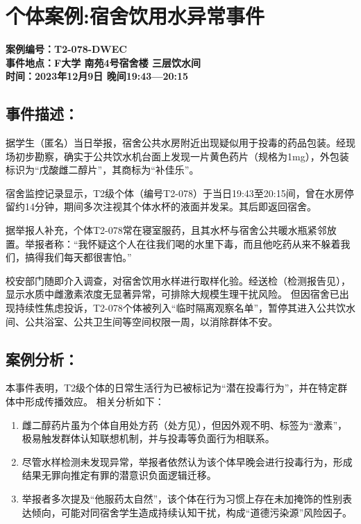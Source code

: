 \documentclass[]{ctexrep}
\begin{document}
	\section{个体案例:宿舍饮用水异常事件}
	\begin{center}
		\textbf{案例编号：T2-078-DWEC\\
	事件地点：F大学 南苑4号宿舍楼 三层饮水间\\
	时间：2023年12月9日 晚间19:43—20:15}
	\end{center}
	\subsection{事件描述：}
	据学生（匿名）当日举报，宿舍公共水房附近出现疑似用于投毒的药品包装。经现场初步勘察，确实于公共饮水机台面上发现一片黄色药片（规格为1mg），外包装标识为“戊酸雌二醇片”，其商标为“补佳乐”。
	
	宿舍监控记录显示，T2级个体（编号T2-078）于当日19:43至20:15间，曾在水房停留约14分钟，期间多次注视其个体水杯的液面并发呆。其后即返回宿舍。
	
	据举报人补充，个体T2-078常在寝室服药，且其水杯与宿舍公共暖水瓶紧邻放置。举报者称：“我怀疑这个人在往我们喝的水里下毒，而且他吃药从来不躲着我们，搞得我们每天都很害怕。”
	
	校安部门随即介入调查，对宿舍饮用水样进行取样化验。经送检（检测报告见\hyperref[附件3.1]{}），显示水质中雌激素浓度无显著异常，可排除大规模生理干扰风险。
	但因宿舍已出现持续性焦虑投诉，T2-078个体被列入“临时隔离观察名单”，暂停其进入公共饮水间、公共浴室、公共卫生间等空间权限一周，以消除群体不安。
	
	\subsection{案例分析：}
	本事件表明，T2级个体的日常生活行为已被标记为“潜在投毒行为”，并在特定群体中形成传播效应。
	相关分析如下：
	\begin{enumerate}
		\item 雌二醇药片虽为个体自用处方药（处方见\hyperref[附件3.2]{}），但因外观不明、标签为“激素”，极易触发群体认知联想机制，并与投毒等负面行为相联系。
		
		\item 尽管水样检测未发现异常，举报者依然认为该个体早晚会进行投毒行为，形成结果无罪向推定有罪的潜意识负面逻辑迁移。
		
		\item 举报者多次提及“他服药太自然”，该个体在行为习惯上存在未加掩饰的性别表达倾向，可能对同宿舍学生造成持续认知干扰，构成“道德污染源”风险因子。
	\end{enumerate} 
\end{document}
